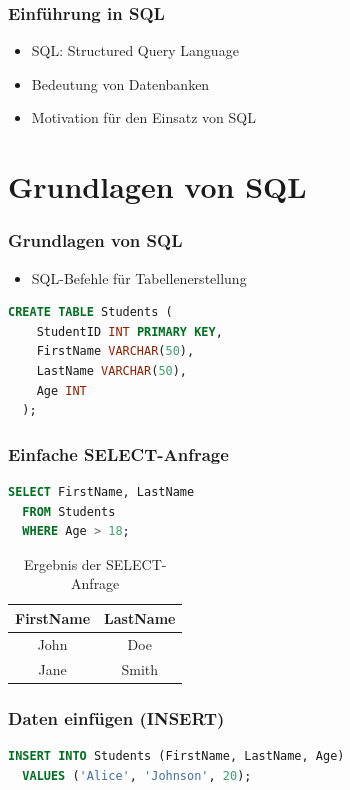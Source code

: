 \begin{frame}
  \frametitle{Einführung in SQL}
  \begin{itemize}
    \item SQL: Structured Query Language
    \item Bedeutung von Datenbanken
    \item Motivation für den Einsatz von SQL
  \end{itemize}
\end{frame}

\section{Grundlagen von SQL}
\begin{frame}[fragile]
  \frametitle{Grundlagen von SQL}
  \begin{itemize}
    \item SQL-Befehle für Tabellenerstellung
  \end{itemize}
  
  \begin{lstlisting}[language=SQL]
  CREATE TABLE Students (
    StudentID INT PRIMARY KEY,
    FirstName VARCHAR(50),
    LastName VARCHAR(50),
    Age INT
  );
  \end{lstlisting}
\end{frame}

\begin{frame}[fragile]
  \frametitle{Einfache SELECT-Anfrage}
  
  \begin{lstlisting}[language=SQL]
  SELECT FirstName, LastName
  FROM Students
  WHERE Age > 18;
  \end{lstlisting}
  
  \begin{table}[h]
    \centering
    \begin{tabular}{|c|c|}
      \hline
      FirstName & LastName \\
      \hline
      John & Doe \\
      Jane & Smith \\
      \hline
    \end{tabular}
    \caption{Ergebnis der SELECT-Anfrage}
  \end{table}
\end{frame}


\begin{frame}[fragile]
  \frametitle{Daten einfügen (INSERT)}
  
  \begin{lstlisting}[language=SQL]
  INSERT INTO Students (FirstName, LastName, Age)
  VALUES ('Alice', 'Johnson', 20);
  \end{lstlisting}
\end{frame}

